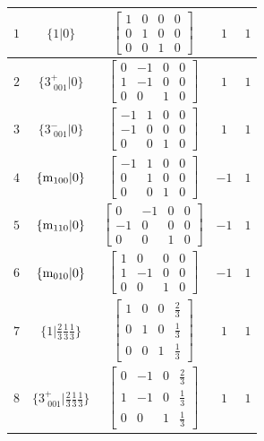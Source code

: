 \documentclass[fleqn,8pt]{jsarticle}
\begin{document}
\begin{longtable}{ccccc}
$ 1 $ & $ \{1|0\} $ & $ \begin{bmatrix} 1 & 0 & 0 & 0 \\ 0 & 1 & 0 & 0 \\ 0 & 0 & 1 & 0 \end{bmatrix} $ & $ 1 $ & $ 1 $ \\ \hline
$ 2 $ & $ \{3^{+}_{\,\,001}|0\} $ & $ \begin{bmatrix} 0 & -1 & 0 & 0 \\ 1 & -1 & 0 & 0 \\ 0 & 0 & 1 & 0 \end{bmatrix} $ & $ 1 $ & $ 1 $ \\ \hline
$ 3 $ & $ \{3^{-}_{\,\,001}|0\} $ & $ \begin{bmatrix} -1 & 1 & 0 & 0 \\ -1 & 0 & 0 & 0 \\ 0 & 0 & 1 & 0 \end{bmatrix} $ & $ 1 $ & $ 1 $ \\ \hline
$ 4 $ & $ \{{\rm m}_{100}|0\} $ & $ \begin{bmatrix} -1 & 1 & 0 & 0 \\ 0 & 1 & 0 & 0 \\ 0 & 0 & 1 & 0 \end{bmatrix} $ & $ -1 $ & $ 1 $ \\ \hline
$ 5 $ & $ \{{\rm m}_{110}|0\} $ & $ \begin{bmatrix} 0 & -1 & 0 & 0 \\ -1 & 0 & 0 & 0 \\ 0 & 0 & 1 & 0 \end{bmatrix} $ & $ -1 $ & $ 1 $ \\ \hline
$ 6 $ & $ \{{\rm m}_{010}|0\} $ & $ \begin{bmatrix} 1 & 0 & 0 & 0 \\ 1 & -1 & 0 & 0 \\ 0 & 0 & 1 & 0 \end{bmatrix} $ & $ -1 $ & $ 1 $ \\ \hline
$ 7 $ & $ \{1|\frac{2}{3} \frac{1}{3} \frac{1}{3}\} $ & $ \begin{bmatrix} 1 & 0 & 0 & \frac{2}{3} \\ 0 & 1 & 0 & \frac{1}{3} \\ 0 & 0 & 1 & \frac{1}{3} \end{bmatrix} $ & $ 1 $ & $ 1 $ \\ \hline
$ 8 $ & $ \{3^{+}_{\,\,001}|\frac{2}{3} \frac{1}{3} \frac{1}{3}\} $ & $ \begin{bmatrix} 0 & -1 & 0 & \frac{2}{3} \\ 1 & -1 & 0 & \frac{1}{3} \\ 0 & 0 & 1 & \frac{1}{3} \end{bmatrix} $ & $ 1 $ & $ 1 $ \\ \hline

\end{longtable}
\end{document}
